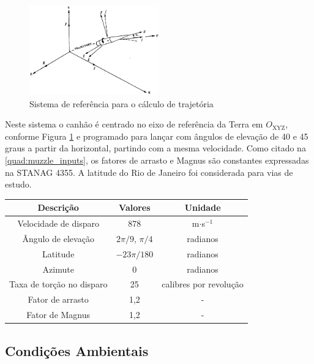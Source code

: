 \begin{figure}[!ht]
	\centering
	\includegraphics[width=0.5\textwidth]{foto02-mccoy2012.png}   
	\caption[Sistema de referência para o cálculo de trajetória]{Sistema de referência para o cálculo de trajetória \cite{McCoy2012}}
	\label{fig:traj-ref-mccoy2012}
\end{figure}

Neste sistema o canhão é centrado no eixo de referência da Terra em $O_{\text{XYZ}}$, conforme Figura \ref{fig:traj-ref-mccoy2012} e programado para lançar com ângulos de elevação de 40 e 45 graus a partir da horizontal, partindo com a mesma velocidade. Como citado na \autoref{quad:muzzle_inputs}, os fatores de arrasto e Magnus são constantes expressadas na STANAG 4355. A latitude do Rio de Janeiro foi considerada para vias de estudo.

\begin{quadro}[htb]
\caption{\label{quad:muzzle_inputs}Dados Balísticos}
\begin{tabular}{|c|c|c|}
\hline
\textbf{Descrição} & \textbf{Valores} & \textbf{Unidade}\\
\hline
Velocidade de disparo & 878 & m$\cdot$s$^{-1}$\\
\hline
Ângulo de elevação & $2\pi/9$, $\pi/4$ & radianos \\
\hline
Latitude & $-23 \pi/180$ & radianos \\
\hline
Azimute & 0 & radianos \\
\hline
Taxa de torção no disparo & 25 & calibres por revolução \\
\hline
Fator de arrasto & 1,2 & - \\
\hline
Fator de Magnus & 1,2 & - \\
\hline
\end{tabular}
\end{quadro}

\subsection{Condições Ambientais}\label{subsec:condicoes-ambientais}

